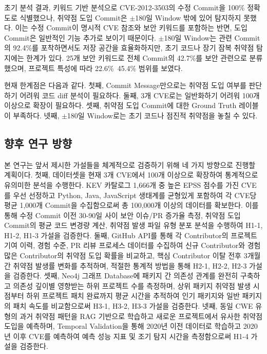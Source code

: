 ﻿\documentclass[conference]{IEEEtran}
\begin{document}
초기 분석 결과, 키워드 기반 분석으로 CVE-2012-3503의 수정 Commit을 100\% 정확도로 식별했으나, 취약점 도입 Commit은 $\pm$180일 Window 밖에 있어 탐지하지 못했다. 이는 수정 Commit이 명시적 CVE 참조와 보안 키워드를 포함하는 반면, 도입 Commit은 일반적인 기능 추가로 보이기 때문이다. $\pm$180일 Window는 관련 Commit의 92.4\%를 포착하면서도 저장 공간을 효율화하지만, 초기 코드나 장기 잠복 취약점 탐지에는 한계가 있다. 25개 보안 키워드로 전체 Commit의 42.7\%를 보안 관련으로 분류했으며, 프로젝트 특성에 따라 22.6\%~45.4\% 범위를 보였다.

현재 한계점은 다음과 같다. 첫째, Commit Message만으로는 취약점 도입 여부를 판단하기 어려워 코드 diff 분석이 필요하다. 둘째, 3개 CVE로는 일반화하기 어려워 100개 이상으로 확장이 필요하다. 셋째, 취약점 도입 Commit에 대한 Ground Truth 레이블이 부족하다. 넷째, $\pm$180일 Window로는 초기 코드나 점진적 취약점을 놓칠 수 있다.

\subsection{향후 연구 방향}

본 연구는 앞서 제시한 가설들을 체계적으로 검증하기 위해 네 가지 방향으로 진행할 계획이다. 첫째, 데이터셋을 현재 3개 CVE에서 100개 이상으로 확장하여 통계적으로 유의미한 분석을 수행한다. KEV 카탈로그 1,666개 중 높은 EPSS 점수를 가진 CVE를 우선 선정하고 Python, Java, JavaScript 생태계를 균형있게 포함하여 각 CVE당 평균 1,000개 Commit을 수집함으로써 총 100,000개 이상의 데이터를 확보한다. 이를 통해 수정 Commit 이전 30-90일 사이 보안 이슈/PR 증가율 측정, 취약점 도입 Commit의 평균 코드 변경량 계산, 취약점 발생 파일 유형 분포 분석을 수행하여 H1-1, H1-2, H1-3 가설을 검증한다. 둘째, GitHub API를 통해 각 Contributor의 프로젝트 기여 이력, 경험 수준, PR 리뷰 프로세스 데이터를 수집하여 신규 Contributor와 경험 많은 Contributor의 취약점 도입 확률을 비교하고, 핵심 Contributor 이탈 전후 3개월간 취약점 발생률 변화를 추적하며, 적절한 통계적 방법을 통해 H2-1, H2-2, H2-3 가설을 검증한다. 셋째, Neo4j 그래프 Database에 패키지 간 의존성 관계를 완전히 구축하고 의존성 깊이별 영향받는 하위 프로젝트 수를 측정하며, 상위 패키지 취약점 발생 시점부터 하위 프로젝트 패치 완료까지 평균 시간을 추적하여 인기 패키지와 일반 패키지의 패치 속도를 비교함으로써 H3-1, H3-2, H3-3 가설을 검증한다. 넷째, 동일 CWE 유형의 과거 취약점 패턴을 RAG 기반으로 학습하고 새로운 프로젝트에서 유사한 취약점 도입을 예측하며, Temporal Validation을 통해 2020년 이전 데이터로 학습하고 2020년 이후 CVE를 예측하여 예측 성능 지표 및 조기 탐지 시간을 측정함으로써 H1-4 가설을 검증한다.
\end{document}
